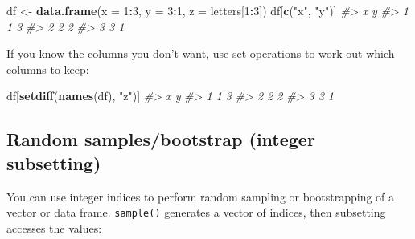 \documentclass[]{book}
\newenvironment{Shaded}{\begin{snugshade}}{\end{snugshade}}
\newcommand{\CommentTok}[1]{\textcolor[rgb]{0.56,0.35,0.01}{\textit{#1}}}
\newcommand{\DataTypeTok}[1]{\textcolor[rgb]{0.13,0.29,0.53}{#1}}
\newcommand{\DecValTok}[1]{\textcolor[rgb]{0.00,0.00,0.81}{#1}}
\newcommand{\KeywordTok}[1]{\textcolor[rgb]{0.13,0.29,0.53}{\textbf{#1}}}
\newcommand{\NormalTok}[1]{#1}
\newcommand{\OperatorTok}[1]{\textcolor[rgb]{0.81,0.36,0.00}{\textbf{#1}}}
\newcommand{\StringTok}[1]{\textcolor[rgb]{0.31,0.60,0.02}{#1}}
\theoremstyle{definition}
\theoremstyle{definition}
\theoremstyle{definition}
\theoremstyle{remark}
\begin{document}
\begin{Shaded}
\begin{Highlighting}[]
\NormalTok{df <-}\StringTok{ }\KeywordTok{data.frame}\NormalTok{(}\DataTypeTok{x =} \DecValTok{1}\OperatorTok{:}\DecValTok{3}\NormalTok{, }\DataTypeTok{y =} \DecValTok{3}\OperatorTok{:}\DecValTok{1}\NormalTok{, }\DataTypeTok{z =}\NormalTok{ letters[}\DecValTok{1}\OperatorTok{:}\DecValTok{3}\NormalTok{])}
\NormalTok{df[}\KeywordTok{c}\NormalTok{(}\StringTok{"x"}\NormalTok{, }\StringTok{"y"}\NormalTok{)]}
\CommentTok{#>   x y}
\CommentTok{#> 1 1 3}
\CommentTok{#> 2 2 2}
\CommentTok{#> 3 3 1}
\end{Highlighting}
\end{Shaded}

If you know the columns you don't want, use set operations to work out
which columns to keep:

\begin{Shaded}
\begin{Highlighting}[]
\NormalTok{df[}\KeywordTok{setdiff}\NormalTok{(}\KeywordTok{names}\NormalTok{(df), }\StringTok{"z"}\NormalTok{)]}
\CommentTok{#>   x y}
\CommentTok{#> 1 1 3}
\CommentTok{#> 2 2 2}
\CommentTok{#> 3 3 1}
\end{Highlighting}
\end{Shaded}

\hypertarget{random-samplesbootstrap-integer-subsetting}{%
\subsection{Random samples/bootstrap (integer
subsetting)}\label{random-samplesbootstrap-integer-subsetting}}

You can use integer indices to perform random sampling or bootstrapping
of a vector or data frame. \texttt{sample()} generates a vector of
indices, then subsetting accesses the values:
\end{document}
